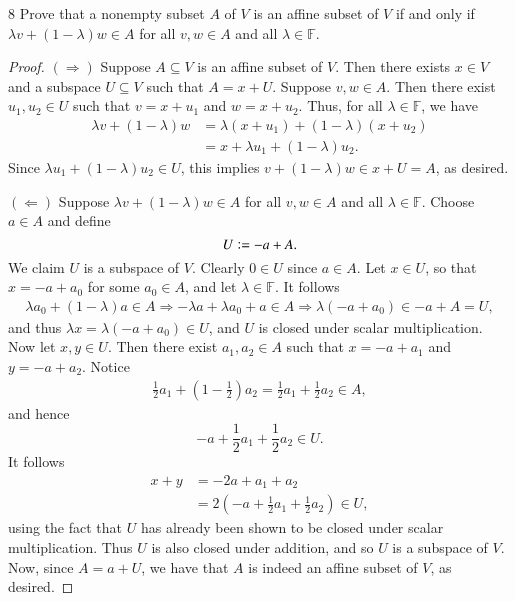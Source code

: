 \documentclass[11pt]{extarticle}
\newenvironment{problem}[1]{\begin{prob*}{#1}{}}{\end{prob*}}
\newcommand{\F}{\mathbb{F}}
\newcommand{\defeq}{\vcentcolon=}
\begin{document}
\begin{problem}{8}
Prove that a nonempty subset $A$ of $V$ is an affine subset of $V$ if and only if $\lambda v + (1 - \lambda)w\in A$ for all $v,w\in A$ and all $\lambda \in \F$.
\end{problem}
\begin{proof}
$(\Rightarrow)$ Suppose $A\subseteq V$ is an affine subset of $V$.  Then there exists $x\in V$ and a subspace $U\subseteq V$ such that $A = x + U$.  Suppose $v,w \in A$.  Then there exist $u_1,u_2\in U$ such that $v = x + u_1$ and $w = x + u_2$.  Thus, for all $\lambda \in \F$, we have
\begin{align*}
\lambda v + (1 - \lambda) w &= \lambda( x+  u_1) + (1 - \lambda)(x + u_2)\\
&= x + \lambda u_1 + (1 - \lambda)u_2.
\end{align*}
Since $\lambda u_1 + (1 - \lambda)u_2 \in U$, this implies $ v + (1 - \lambda) w\in x + U = A$, as desired.
\par $(\Leftarrow)$ Suppose $\lambda v + (1 - \lambda)w\in A$ for all $v,w\in A$ and all $\lambda \in \F$.  Choose $a \in A$ and define
\begin{equation*}
U \defeq -a + A.
\end{equation*}
We claim $U$ is a subspace of $V$.  Clearly $0\in U$ since $a\in A$.  Let $x \in U$, so that $x = -a + a_0$ for some $a_0\in A$, and let $\lambda\in \F$.  It follows
\begin{align*}
\lambda a_0 + (1 - \lambda)a \in A \Rightarrow -\lambda a +\lambda a_0 + a \in A \Rightarrow \lambda(-a + a_0)\in -a + A = U,
\end{align*}
and thus $\lambda x = \lambda(-a + a_0)\in U$, and $U$ is closed under scalar multiplication.  Now let $x, y\in U$.  Then there exist $a_1,a_2\in A$ such that $x = -a + a_1$ and $y = -a + a_2$. Notice 
\begin{align*}
\frac{1}{2}a_1 + \left(1 - \frac{1}{2}\right)a_2 = \frac{1}{2}a_1 + \frac{1}{2}a_2 \in A,
\end{align*}
and hence 
\begin{equation*}
-a + \frac{1}{2}a_1 + \frac{1}{2}a_2 \in U.
\end{equation*}
It follows
\begin{align*}
x + y &= -2a + a_1 + a_2\\
&= 2\left(-a + \frac{1}{2}a_1 + \frac{1}{2}a_2\right)\in U,
\end{align*}
using the fact that $U$ has already been shown to be closed under scalar multiplication.  Thus $U$ is also closed under addition, and so $U$ is a subspace of $V$.  Now, since $A = a + U$, we have that $A$ is indeed an affine subset of $V$, as desired.
\end{proof}
\end{document}
